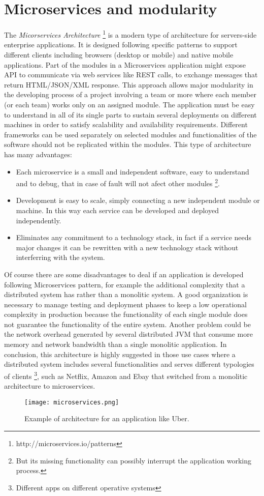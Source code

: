 \section{Microservices and modularity}
\label{sec:4}
The \textit{Micorservices Architecture} \footnote{http://microservices.io/patterns} is a modern type of architecture for servers-side enterprise applications. It is designed following specific patterns to support different clients including browsers (desktop or mobile) and native mobile applications. Part of the modules in a Microservices application might expose API to communicate via web services like REST calls, to exchange messages that return HTML/JSON/XML response.
This approach allows major modularity in the developing process of a project involving a team or more where each member (or each team) works only on an assigned module.
The application must be easy to understand in all of its single parts to sustain several deployments on different machines in order to satisfy scalability and availability requirements.
Different frameworks can be used separately on selected modules and functionalities of the software should not be replicated within the modules.
This type of architecture has many advantages:
\begin{itemize}
	\item Each microservice is a small and independent software, easy to understand and to debug, that in case of fault will not afect other modules \footnote{But its missing functionality can possibly interrupt the application working process.}.
	\item Development is easy to scale, simply connecting a new independent module or machine. In this way each service can be developed and deployed independently.
	\item Eliminates any commitment to a technology stack, in fact if a service needs major changes  it can be rewritten with a new technology stack without interferring with the system.
\end{itemize}
Of course there are some disadvantages to deal if an application is developed following Microservices pattern, for example the additional complexity that a distributed system has rather than a monolitic system.
A good organization is necessary to manage testing and deployment phases  to keep a low operational complexity in production because the functionality of each single module does not guarantee the functionality of the entire system.
Another problem could be the network overhead generated by several distributed JVM that consume more memory and  network bandwidth than a single monolitic application.
In conclusion, this architecture is highly suggested in those use cases where a distributed system  includes several functionalities and serves different typologies of clients \footnote{Different apps on different operative systems}, such as Netflix, Amazon and Ebay that switched from a monolitic architecture to microservices.
\begin{figure}[H]
\texttt{[image: microservices.png]}
\centering
\caption{Example of architecture for an application like Uber.}
\end{figure}

